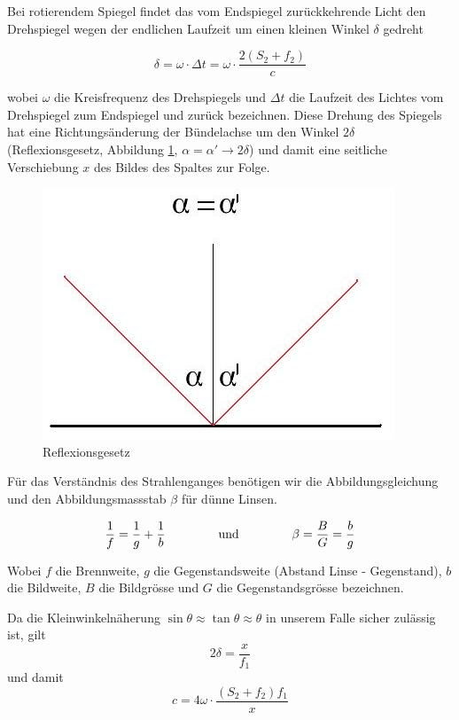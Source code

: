 Bei rotierendem Spiegel findet  das  vom  Endspiegel  zur\"uckkehrende Licht den
Drehspiegel wegen der  endlichen  Laufzeit  um  einen  kleinen  Winkel  $\delta$
gedreht

\begin{equation}
    \delta = \omega \cdot \Delta t = \omega \cdot \frac{2(S_2 + f_2)}{c}
    \label{eq:delta}
\end{equation}

wobei  $\omega$  die Kreisfrequenz des Drehspiegels und $\Delta t$ die  Laufzeit
des  Lichtes  vom  Drehspiegel zum Endspiegel  und  zur\"uck  bezeichnen.  Diese
Drehung des Spiegels  hat  eine  Richtungs\"anderung  der  B\"undelachse  um den
Winkel   $2\delta$  (Reflexionsgesetz,   Abbildung   \ref{fig:reflexionsgesetz},
$\alpha=\alpha'  \to  2\delta$)  und  damit eine seitliche Verschiebung $x$  des
Bildes des Spaltes zur Folge.

\begin{figure}[H]
    \center
    \includegraphics[width=.4\textwidth]{images/reflexionsgesetz.jpg}
    \caption{Reflexionsgesetz}
    \label{fig:reflexionsgesetz}
\end{figure}

F\"ur   das   Verst\"andnis    des    Strahlenganges    ben\"otigen    wir   die
Abbildungsgleichung und  den  Abbildungsmassstab  $\beta$  f\"ur d\"unne Linsen.

\begin{equation}
    \frac{1}{f} = \frac{1}{g} + \frac{1}{b}
    \hspace{15mm}\textrm{und}\hspace{15mm}
    \beta = \frac{B}{G} = \frac{b}{g}
    \label{eq:optik}
\end{equation}

Wobei $f$ die Brennweite, $g$ die Gegenstandsweite (Abstand Linse - Gegenstand),
$b$  die  Bildweite,  $B$  die  Bildgr\"osse  und  $G$  die  Gegenstandsgr\"osse
bezeichnen.

Da die Kleinwinkeln\"aherung $\sin\theta \approx \tan\theta \approx \theta$ in
unserem Falle sicher zul\"assig ist, gilt
\begin{equation}
    2\delta = \frac{x}{f_1}
\end{equation}
und damit
\begin{equation}
    c = 4\omega \cdot \frac{(S_2 + f_2)f_1}{x}
\end{equation}

